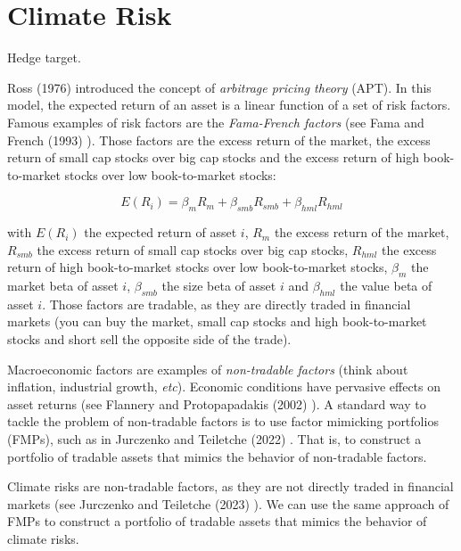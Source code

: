 \chapter{Climate Risk}


Hedge target.

Ross (1976) \cite{ross1976apt} introduced 
the concept of \textit{arbitrage pricing theory} (APT).
In this model, the expected return of an asset is
a linear function of a set of risk factors. Famous examples of risk factors are the
\textit{Fama-French factors} (see Fama and French (1993) \cite{fama1993common}).
Those factors are the excess return of the market,
the excess return of small cap stocks over big cap stocks
and the excess return of high book-to-market stocks over low book-to-market stocks:

\begin{equation}
    E(R_i) = \beta_m R_m + \beta_{smb} R_{smb} + \beta_{hml} R_{hml}
\end{equation}

with $E(R_i)$ the expected return of asset $i$,
$R_m$ the excess return of the market, $R_{smb}$ the excess return of small cap stocks over big cap stocks,
$R_{hml}$ the excess return of high book-to-market stocks over low book-to-market stocks,
$\beta_m$ the market beta of asset $i$, $\beta_{smb}$ the size beta of asset $i$ and $\beta_{hml}$ the value beta of asset $i$.
Those factors are tradable, as 
they are directly traded in financial markets (you can buy 
the market, small cap stocks and high book-to-market stocks
and short sell the opposite side of the trade).

Macroeconomic factors are examples of 
\textit{non-tradable factors} (think about inflation, 
industrial growth, \textit{etc}). Economic conditions 
have pervasive effects on asset returns (see Flannery 
and Protopapadakis (2002) \cite{flannery2002macroeconomic}).
A standard way to tackle the problem of non-tradable factors
is to use factor mimicking portfolios (FMPs), such 
as in Jurczenko and Teiletche (2022) \cite{jurczenko2022macro}. That is,
to construct a portfolio of tradable assets that
mimics the behavior of non-tradable factors. 


Climate risks are non-tradable factors,
as they are not directly traded in financial markets
(see Jurczenko and Teiletche (2023) \cite{jurczenko2023climate}).
We can use the same approach of FMPs to construct
a portfolio of tradable assets that mimics the behavior
of climate risks.



